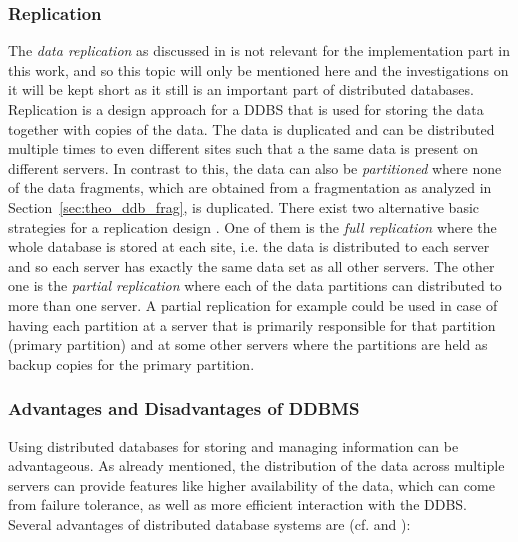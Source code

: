 \subsubsection{Replication}
\label{sec:theo_ddb_repl}
The \emph{data replication} as discussed in \citet{Wiese2014} is not relevant for the implementation part in this work, and so this topic will only be
mentioned here and the investigations on it will be kept short as it still is an important part of distributed databases. Replication is a design approach
for a DDBS that is used for storing the data together with copies of the data. The data is duplicated and can be distributed multiple times to even 
different sites such that a the same data is present on different servers. In contrast to this, the data can also be \emph{partitioned} where none of the
data fragments, which are obtained from a fragmentation as analyzed in Section~\ref{sec:theo_ddb_frag}, is duplicated. There exist two alternative basic
strategies for a replication design \cite[p.~12]{Ozsu1991}. One of them is the \emph{full replication} where the whole database is stored at each site,
i.e. the data is distributed to each server and so each server has exactly the same data set as all other servers. The other one is the 
\emph{partial replication} where each of the data partitions can distributed to more than one server. A partial replication for example could be used in
case of having each partition at a server that is primarily responsible for that partition (primary partition) and at some other servers where the
partitions are held as backup copies for the primary partition.


\subsubsection{Advantages and Disadvantages of DDBMS}
Using distributed databases for storing and managing information can be advantageous. As already mentioned, the distribution of the data across multiple 
servers can provide features like higher availability of the data, which can come from failure tolerance, as well as more efficient interaction with the
DDBS. Several advantages of distributed database systems are (cf. \citep{Jadhav2017} and \cite[p.~8ff.]{Ozsu1991}):

